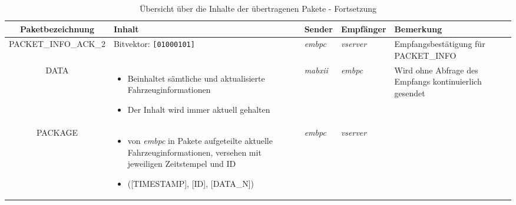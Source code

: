 \documentclass[fontsize = 12pt, paper = a4]{scrreprt}
\begin{document}
\newpage

\begin{table}[H]
\centering

\caption{Übersicht über die Inhalte der übertragenen Pakete - Fortsetzung}

\begin{tabular}{c | p{4cm} | p{1.5cm} | p{2cm} | p{4cm} }
 
\toprule[1.5pt]

Paket\-bezeichnung & Inhalt & Sender & Empfänger & Bemerkung \\
 
\midrule

PACKET\_INFO\_ACK\_2 & Bitvektor: \texttt{[01000101]}

& \emph{embpc} & \emph{vserver} & Empfangsbestäti\-gung für PACKET\_INFO
 \\

\midrule

DATA & 

\vspace*{-8mm}

\begin{itemize}[leftmargin=*]

\item Beinhaltet sämtliche und aktualisierte Fahrzeuginformationen

\item Der Inhalt wird immer aktuell gehalten

\end{itemize} 

& \emph{mabxii} & \emph{embpc} & Wird ohne Abfrage des Empfangs kontinuierlich gesendet \\

\midrule

PACKAGE & 

\vspace*{-8mm}

\begin{itemize}[leftmargin=*]

\item von \emph{embpc} in Pakete aufgeteilte aktuelle Fahrzeuginformationen, versehen mit jeweiligen Zeitstempel und ID

\item ([TIMESTAMP], [ID], [DATA\_N])

\end{itemize} 

& \emph{embpc} & \emph{vserver} & 

\vspace*{-8mm}


\end{tabular}
\end{table}
\end{document}
